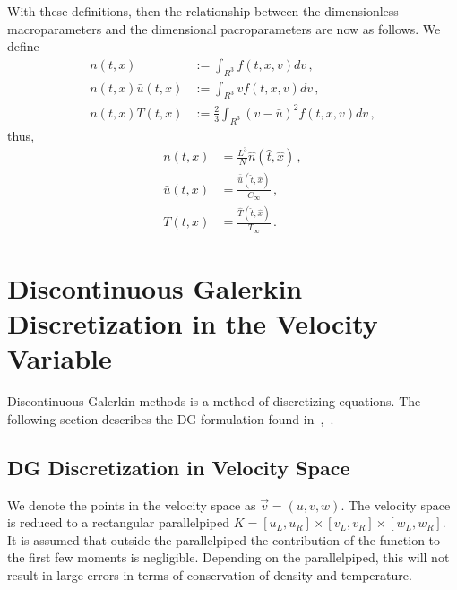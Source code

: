 \documentclass[12pt]{CSUNthesis}
\begin{document}
With these definitions, then the relationship between the dimensionless macroparameters and the dimensional pacroparameters are now as follows. We define
\begin{equation}
\begin{split}
\label{eq:dimless_macro}
n(t,x)&:=\int_{R^3} f(t,x,v)  dv\, ,  \\
n(t,x)\bar{u}(t,x)&:=\int_{R^3} vf(t,x,v) dv\,  ,  \\
n(t,x)T(t,x)&:=\frac{2}{3} \int_{R^3} (v - \bar{u})^2 f(t,x,v) dv\, , 
\end{split}
\end{equation}
thus, 
\begin{equation}
\begin{split}
n(t,x)&=\frac{L^3 }{N} \hat{n}(\hat{t},\hat{x})\, , \nonumber  \\
\bar{u}(t,x)&=\frac{\bar{\hat{u}}(\hat{t},\hat{x})}{C_{\infty}}\, , \nonumber \\ 
T(t,x) &= \frac{\hat{T}(\hat{t},\hat{x})}{T_{\infty}} \, .
\end{split}
\end{equation}

\chapter{Discontinuous Galerkin Discretization in the Velocity Variable}

Discontinuous Galerkin methods is a method of discretizing equations. The following section describes the DG formulation found in~\cite{AlekseenkoJosyula2012},~\cite{AlekseenkoNguyenWood2015}.

\section{DG Discretization in Velocity Space}
We denote the points in the velocity space as $\vec{v} = (u,v,w)$. The velocity space is reduced to a rectangular parallelpiped $K=[u_L, u_R] \times [v_L,v_R] \times [w_L,w_R]$. It is assumed that outside the parallelpiped the contribution of the function to the first few moments is negligible. Depending on the parallelpiped, this will not result in large errors in terms of conservation of density and temperature. 
\end{document}
